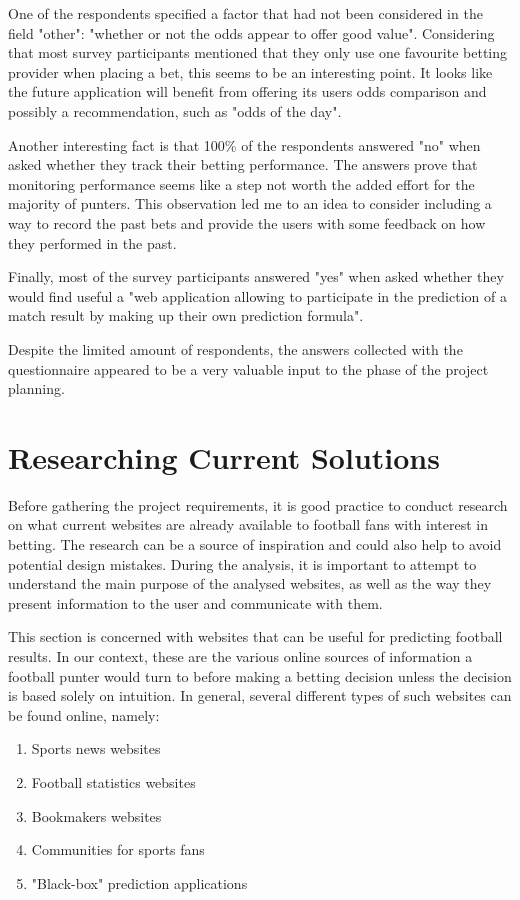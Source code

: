 One of the respondents specified a factor that had not been considered in the field "other": "whether or not the odds appear to offer good value". Considering that most survey participants mentioned that they only use one favourite betting provider when placing a bet, this seems to be an interesting point. It looks like the future application will benefit from offering its users odds comparison and possibly a recommendation, such as "odds of the day".

Another interesting fact is that 100\% of the respondents answered "no" when asked whether they track their betting performance. The answers prove that monitoring performance seems like a step not worth the added effort for the majority of punters. This observation led me to an idea to consider including a way to record the past bets and provide the users with some feedback on how they performed in the past. 

Finally, most of the survey participants answered "yes" when asked whether they would find useful a "web application allowing to participate in the prediction of a match result by making up their own prediction formula". 

Despite the limited amount of respondents, the answers collected with the questionnaire appeared to be a very valuable input to the phase of the project planning.

\section{Researching Current Solutions}
\label{sec:currentsolutions_req}
Before gathering the project requirements, it is good practice to conduct research on what current websites are already available to football fans with interest in betting. The research can be a source of inspiration and could also help to avoid potential design mistakes. During the analysis, it is important to attempt to understand the main purpose of the analysed websites, as well as the way they present information to the user and communicate with them.

This section is concerned with websites that can be useful for predicting football results. In our context, these are the various online sources of information a football punter would turn to before making a betting decision unless the decision is based solely on intuition. In general, several different types of such websites can be found online, namely:
		
\begin{enumerate}
	\item Sports news websites
	\item Football statistics websites
	\item Bookmakers websites
	\item Communities for sports fans
	\item "Black-box" prediction applications
\end{enumerate}

